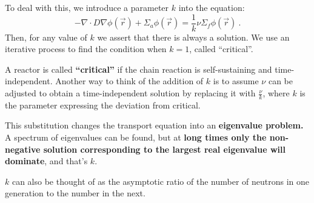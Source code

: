 \documentclass[12pt]{article}
\begin{document}
To deal with this, we introduce a parameter $k$ into the equation:
%
\begin{equation}
-\nabla \cdot D\nabla \phi(\vec{r}) + 
\Sigma_a \phi(\vec{r}) = \frac{1}{k}\nu \Sigma_f \phi(\vec{r})\:. \nonumber
\end{equation}
%
Then, for any value of $k$ we assert that there is always a solution. We use an iterative process to find the condition when $k=1$, called ``critical''.

A reactor is called \textbf{``critical''} if the chain reaction is self-sustaining and time-independent. Another way to think of the addition of $k$ is to assume $\nu$ can be adjusted to obtain a time-independent solution by replacing it with $\frac{\nu}{k}$, where $k$ is the parameter expressing the deviation from critical. 

This substitution changes the transport equation into an \textbf{eigenvalue problem.} A spectrum of eigenvalues can be found, but at \textbf{long times only the non-negative solution corresponding to the largest real eigenvalue will dominate}, and that's $k$. 

$k$ can also be thought of as the asymptotic ratio of the number of neutrons in one generation to the number in the next.

%
% 
\end{document}
